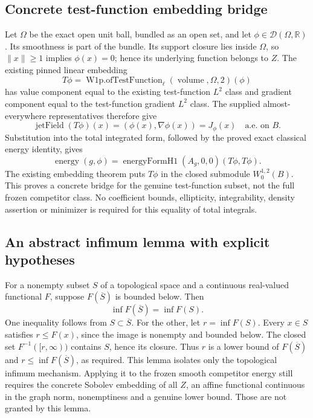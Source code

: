 \documentclass[11pt]{article}
\theoremstyle{definition}
\theoremstyle{remark}
\numberwithin{equation}{section}
\begin{document}
\subsection{Concrete test-function embedding bridge}\label{energy-bridge:test-function}
Let $\Omega$ be the exact open unit ball, bundled as an open set, and let
$\phi\in\mathcal D(\Omega,\mathbb R)$. Its smoothness is part of the
bundle. Its support closure lies inside $\Omega$, so $\|x\|\ge1$ implies
$\phi(x)=0$; hence its underlying function belongs to $Z$.
The existing pinned linear embedding
\[
 T\phi=\operatorname{W1p.ofTestFunction}_{\ell}
       (\operatorname{volume},\Omega,2)(\phi)
\]
has value component equal to the existing test-function $L^2$ class and
gradient component equal to the test-function gradient $L^2$ class.
The supplied almost-everywhere representatives therefore give
\[
 \operatorname{jetField}(T\phi)(x)
   =(\phi(x),\nabla\phi(x))=J_\phi(x)
 \quad\text{a.e. on }B.
\]
Substitution into the total integrated form, followed by the proved exact
classical energy identity, gives
\[
 \operatorname{energy}(g,\phi)
 =\operatorname{energyFormH1}(A_g,0,0)(T\phi,T\phi).
\]
The existing embedding theorem puts $T\phi$ in the closed submodule
$W^{1,2}_0(B)$. This proves a concrete bridge for the genuine test-function
subset, not the full frozen competitor class. No coefficient bounds,
ellipticity, integrability, density assertion or minimizer is required for
this equality of total integrals.
\subsection{An abstract infimum lemma with explicit hypotheses}\label{energy-bridge:infimum}
For a nonempty subset $S$ of a topological space and a continuous real-valued
functional $F$, suppose $F(\overline S)$ is bounded below. Then
\[
 \inf F(\overline S)=\inf F(S).
\]
One inequality follows from $S\subset\overline S$. For the other, let
$r=\inf F(S)$. Every $x\in S$ satisfies $r\le F(x)$, since the image is
nonempty and bounded below. The closed set $F^{-1}([r,\infty))$ contains
$S$, hence its closure. Thus $r$ is a lower bound of $F(\overline S)$ and
$r\le\inf F(\overline S)$, as required.
This lemma isolates only the topological infimum mechanism. Applying it to
the frozen smooth competitor energy still requires the concrete Sobolev
embedding of all $Z$, an affine functional continuous in the graph norm,
nonemptiness and a genuine lower bound. Those are not granted by this lemma.

\clearpage
\end{document}
